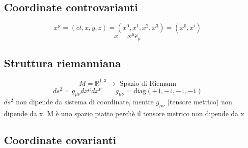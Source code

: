 \documentclass[a4paper,11pt]{report}
\theoremstyle{remark}
\theoremstyle{definition}
\newcommand{\R}{\mathbb{R}}
\begin{document}
\subsection*{Coordinate controvarianti}
\begin{equation*}
    x^\mu = (ct,x,y,z) = (x^0,x^1,x^2,x^3) = (x^0,x^i)
\end{equation*}
\begin{equation*}
    x = x^\mu \hat{e}_\mu
\end{equation*}

\subsection*{Struttura riemanniana}
\begin{equation*}
    M = \R^{1,3} \rightarrow \text{ Spazio di Riemann}
\end{equation*}
\begin{equation*}
    ds^2 = g_{\mu\nu} dx^\mu dx^\nu  \qquad g_{\mu\nu} = \mbox{diag}(+1,-1,-1,-1)
\end{equation*}
$ds^2$ non dipende da sistema di coordinate, mentre $g_{\mu\nu}$ (tensore metrico) non dipende da x. M è uno spazio piatto perchè il tensore metrico non dipende da x

\subsection*{Coordinate covarianti}
\end{document}
